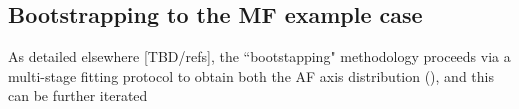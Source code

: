 \subsection{Bootstrapping to the MF example case}

As detailed elsewhere [TBD/refs], the ``bootstapping" methodology proceeds via a multi-stage fitting protocol to obtain both the AF axis distribution (), and this can be further iterated